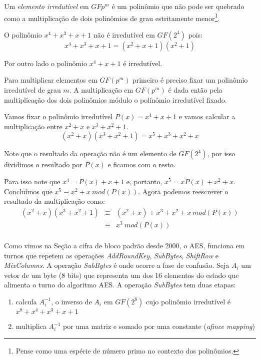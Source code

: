 Um {\em elemento irredutível} em $GF{p^m}$ é um polinômio que não pode ser quebrado como a multiplicação de dois polinômios de grau estritamente menor\footnote{Pense como uma espécie de número primo no contexto dos polinômios.}. 

\begin{example}
  O polinômio $x^4 + x^3 + x + 1$ não é irredutível em $GF(2^4)$ pois:
\begin{displaymath}
  x^4 + x^3 + x + 1 = (x^2 + x + 1)(x^2 + 1)
\end{displaymath}

Por outro lado o polinômio $x^4 + x + 1$ é irredutível.
\end{example}

Para multiplicar elementos em $GF(p^m)$ primeiro é preciso fixar um polinômio irredutível de grau $m$.
A multiplicação em $GF(p^m)$ é dada então pela multiplicação dos dois polinômios módulo o polinômio irredutível fixado.


\begin{example}
  Vamos fixar o polinômio irredutível $P(x) = x^4 + x + 1$ e vamos calcular a multiplicação entre $x^2 + x$ e $x^3 + x^2 + 1$.
  \begin{displaymath}
    (x^2 + x)(x^3 + x^2 + 1) = x^5  + x^3 + x^2  + x
  \end{displaymath}

  Note que o resultado da operação não é um elemento de $GF(2^4)$, por isso dividimos o resultado por $P(x)$ e ficamos com o resto.

Para isso note que $x^4 = P(x) + x + 1$ e, portanto, $x^5 = xP(x) + x^2 + x$. 
Concluímos que $x^5 \equiv x^2 + x\ mod(P(x))$.
Agora podemos reescrever o resultado da multiplicação como:
\begin{eqnarray*}
  (x^2 + x)(x^3 + x^2 + 1) & \equiv & (x^2 + x) + x^3 + x^2 + x\ mod(P(x))\\
                           & \equiv & x^3 \ mod(P(x))\\
\end{eqnarray*}
\end{example}

Como vimos na Seção \label{sec:aes} a cifra de bloco padrão desde 2000, o AES, funciona em turnos que repetem as operações {\em AddRoundKey}, {\em SubBytes}, {\em ShiftRow} e {\em MixColumns}.
A operação {\em SubBytes} é onde ocorre a fase de confusão.
Seja $A_i$ um vetor de um byte (8 bits) que representa um dos 16 elementos do estado que alimenta o turno do algoritmo AES.
A operação {\em SubBytes} tem duas etapas:
\begin{enumerate}
\item calcula $A_i^{-1}$, o inverso de $A_i$ em $GF(2^8)$ cujo polinômio irredutível é $x^8 + x^4 + x^3 + x + 1$
\item multiplica $A_i^{-1}$ por uma matriz e somado por uma constante ({\em afince mapping})
\end{enumerate}

